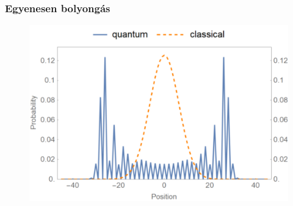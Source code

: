 \documentclass[aspectratio=169]{beamer}
\begin{document}
\begin{frame}
  \frametitle{Egyenesen bolyongás}
  \begin{figure}[H]
    \centering
    \includegraphics[width=0.6\linewidth]{./figures/teve.png}
  \end{figure}
\end{frame}
\end{document}
